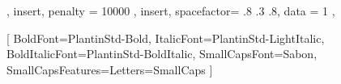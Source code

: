 \usepackage[french, main=latin]{babel}
\usepackage[utf8]{inputenc}
\usepackage[urw-decorativ]{mathdesign}
\usepackage[T1]{fontenc}
\usepackage{fontspec}
\usepackage{newunicodechar}

{ {},         %
	{ insert, penalty = 10000 },                 %
	{ insert, spacefactor= .8 .3 .8, data = 1 }, %
	{}          %
}

\newcommand{\frenchpar}[1]{\begin{otherlanguage*}{french}#1\end{otherlanguage*}}
\newcommand{\fbseries}{\unskip\setBold[0.1]\aftergroup\unsetBold\aftergroup\ignorespaces}

\setmainfont{PlantinStd-Light}[
	BoldFont=PlantinStd-Bold,
	ItalicFont=PlantinStd-LightItalic,
	BoldItalicFont=PlantinStd-BoldItalic,
	SmallCapsFont=Sabon,
	SmallCapsFeatures={Letters=SmallCaps}
]

\newfontfamily{}
\newfontfamily{}

\fontsize{11.5pt}{5mm}\selectfont

\newdimen{\gregoLineDepth}
\gregoLineDepth=2mm
